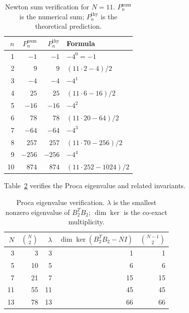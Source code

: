 \documentclass[aip,jmp,reprint,superscriptaddress,floatfix,nofootinbib]{revtex4-2}
\theoremstyle{definition}
\theoremstyle{remark}
\begin{document}
\begin{table}[ht]
\centering
\caption{Newton sum verification for $N = 11$.
  $P_n^{\mathrm{num}}$ is the numerical sum; $P_n^{\mathrm{thy}}$
  is the theoretical prediction.}
\label{tab:newton-numerics}
\begin{tabular}{rrrl}
\toprule
$n$ & $P_n^{\mathrm{num}}$ & $P_n^{\mathrm{thy}}$ & Formula \\
\midrule
1  & $-1$ & $-1$ & $-4^0 = -1$ \\
2  & $9$ & $9$ & $(11 \cdot 2 - 4)/2$ \\
3  & $-4$ & $-4$ & $-4^1$ \\
4  & $25$ & $25$ & $(11 \cdot 6 - 16)/2$ \\
5  & $-16$ & $-16$ & $-4^2$ \\
6  & $78$ & $78$ & $(11 \cdot 20 - 64)/2$ \\
7  & $-64$ & $-64$ & $-4^3$ \\
8  & $257$ & $257$ & $(11 \cdot 70 - 256)/2$ \\
9  & $-256$ & $-256$ & $-4^4$ \\
10 & $874$ & $874$ & $(11 \cdot 252 - 1024)/2$ \\
\bottomrule
\end{tabular}
\end{table}

Table~\ref{tab:proca-numerics} verifies the Proca eigenvalue and
related invariants.

\begin{table}[ht]
\centering
\caption{Proca eigenvalue verification.
  $\lambda$ is the smallest nonzero eigenvalue of $B_2^T B_2$;
  $\dim\ker$ is the co-exact multiplicity.}
\label{tab:proca-numerics}
\begin{tabular}{rrrrr}
\toprule
$N$ & $\binom{N}{2}$ & $\lambda$ & $\dim\ker(B_2^T B_2 - NI)$ &
  $\binom{N-1}{2}$ \\
\midrule
3  & 3  & 3  & 1  & 1 \\
5  & 10 & 5  & 6  & 6 \\
7  & 21 & 7  & 15 & 15 \\
11 & 55 & 11 & 45 & 45 \\
13 & 78 & 13 & 66 & 66 \\
\bottomrule
\end{tabular}
\end{table}
\end{document}
